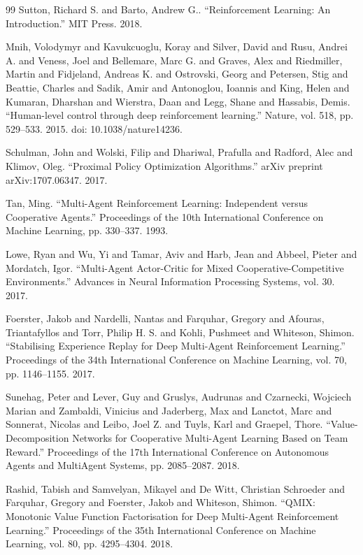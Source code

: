 \documentclass[preprint,12pt]{elsarticle}
\begin{document}
\begin{thebibliography}{99}
 Sutton, Richard S. and Barto, Andrew G.. ``Reinforcement Learning: An Introduction.'' MIT Press. 2018.

 Mnih, Volodymyr and Kavukcuoglu, Koray and Silver, David and Rusu, Andrei A. and Veness, Joel and Bellemare, Marc G. and Graves, Alex and Riedmiller, Martin and Fidjeland, Andreas K. and Ostrovski, Georg and Petersen, Stig and Beattie, Charles and Sadik, Amir and Antonoglou, Ioannis and King, Helen and Kumaran, Dharshan and Wierstra, Daan and Legg, Shane and Hassabis, Demis. ``Human-level control through deep reinforcement learning.'' Nature, vol. 518, pp. 529--533. 2015. doi: 10.1038/nature14236.

 Schulman, John and Wolski, Filip and Dhariwal, Prafulla and Radford, Alec and Klimov, Oleg. ``Proximal Policy Optimization Algorithms.'' arXiv preprint arXiv:1707.06347. 2017.

 Tan, Ming. ``Multi-Agent Reinforcement Learning: Independent versus Cooperative Agents.'' Proceedings of the 10th International Conference on Machine Learning, pp. 330--337. 1993.

 Lowe, Ryan and Wu, Yi and Tamar, Aviv and Harb, Jean and Abbeel, Pieter and Mordatch, Igor. ``Multi-Agent Actor-Critic for Mixed Cooperative-Competitive Environments.'' Advances in Neural Information Processing Systems, vol. 30. 2017.

 Foerster, Jakob and Nardelli, Nantas and Farquhar, Gregory and Afouras, Triantafyllos and Torr, Philip H. S. and Kohli, Pushmeet and Whiteson, Shimon. ``Stabilising Experience Replay for Deep Multi-Agent Reinforcement Learning.'' Proceedings of the 34th International Conference on Machine Learning, vol. 70, pp. 1146--1155. 2017.

 Sunehag, Peter and Lever, Guy and Gruslys, Audrunas and Czarnecki, Wojciech Marian and Zambaldi, Vinicius and Jaderberg, Max and Lanctot, Marc and Sonnerat, Nicolas and Leibo, Joel Z. and Tuyls, Karl and Graepel, Thore. ``Value-Decomposition Networks for Cooperative Multi-Agent Learning Based on Team Reward.'' Proceedings of the 17th International Conference on Autonomous Agents and MultiAgent Systems, pp. 2085--2087. 2018.

 Rashid, Tabish and Samvelyan, Mikayel and De Witt, Christian Schroeder and Farquhar, Gregory and Foerster, Jakob and Whiteson, Shimon. ``QMIX: Monotonic Value Function Factorisation for Deep Multi-Agent Reinforcement Learning.'' Proceedings of the 35th International Conference on Machine Learning, vol. 80, pp. 4295--4304. 2018.


\end{thebibliography}
\end{document}
